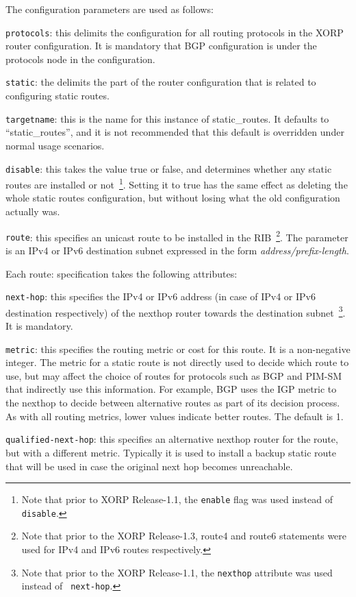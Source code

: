 The configuration parameters are used as follows:
\begin{description}
\item{\tt protocols}: this delimits the configuration for all routing
  protocols in the XORP router configuration.  It is mandatory that
  BGP configuration is under the {\stt protocols} node in the
  configuration.
\item{\tt static}: the delimits the part of the router configuration
  that is related to configuring static routes.
\item{\tt targetname}: this is the name for this instance of
  static\_routes.  It defaults to ``{\stt static\_routes}'', and it is
  not recommended that this default is overridden under normal usage
  scenarios.
\item{\tt disable}: this takes the value {\stt true} or {\stt false},
  and determines whether any static routes are installed or not~\footnote{Note
  that prior to XORP Release-1.1, the {\tt enable} flag was used instead of
  {\tt disable}.}.
  Setting it to {\stt true} has the same effect as deleting the whole
  static routes configuration, but without losing what the old
  configuration actually was.
\item{\tt route}: this specifies an unicast route to be installed in the
  RIB~\footnote{Note that prior to the XORP Release-1.3, route4 and route6
  statements were used for IPv4 and IPv6 routes respectively.}.  The
  parameter is an IPv4 or IPv6 destination subnet expressed in the form
  {\it address/prefix-length}.

  Each {\stt route}: specification takes the following attributes:
\begin{description}
\item{\tt next-hop}: this specifies the IPv4 or IPv6 address (in case of
  IPv4 or IPv6 destination respectively) of the nexthop router towards
  the destination subnet~\footnote{Note that prior to the XORP
  Release-1.1, the {\tt nexthop} attribute was used instead of {\tt
  next-hop}.}. It is mandatory.
\item{\tt metric}: this specifies the routing metric or cost for this
  route.  It is a non-negative integer.  The metric for a static route
  is not directly used to decide which route to use, but may affect
  the choice of routes for protocols such as BGP and PIM-SM that
  indirectly use this information.  For example, BGP uses the IGP
  metric to the nexthop to decide between alternative routes as part
  of its decision process.  As with all routing metrics, lower values
  indicate better routes. The default is 1.
\item{\tt qualified-next-hop}: this specifies an alternative nexthop
  router for the route, but with a different metric. Typically it is
  used to install a backup static route that will be used in case the
  original next hop becomes unreachable.


\end{description}
\end{description}
